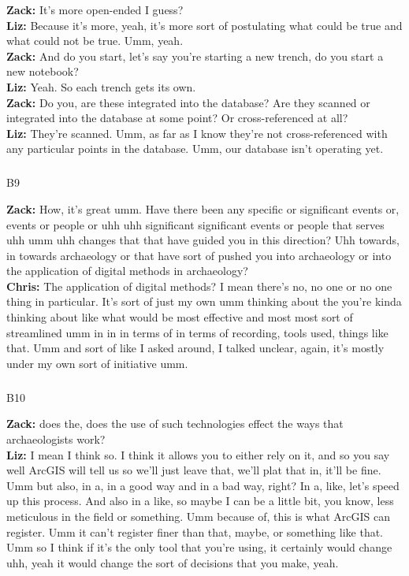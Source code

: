 \documentclass[
]{article}
\makeatletter
\let\oldsubparagraph\subparagraph
\renewcommand{\subparagraph}{
    \@ifstar
      \xxxSubParagraphStar
      \xxxSubParagraphNoStar
  }
\newcommand{\xxxSubParagraphStar}[1]{\oldsubparagraph*{#1}\mbox{}}
\newcommand{\xxxSubParagraphNoStar}[1]{\oldsubparagraph{#1}\mbox{}}
\makeatother
\begin{document}
\textbf{Zack:} It's more open-ended I guess?\\
\textbf{Liz:} Because it's more, yeah, it's more sort of postulating
what could be true and what could not be true. Umm, yeah.\\
\textbf{Zack:} And do you start, let's say you're starting a new trench,
do you start a new notebook?\\
\textbf{Liz:} Yeah. So each trench gets its own.\\
\textbf{Zack:} Do you, are these integrated into the database? Are they
scanned or integrated into the database at some point? Or
cross-referenced at all?\\
\textbf{Liz:} They're scanned. Umm, as far as I know they're not
cross-referenced with any particular points in the database. Umm, our
database isn't operating yet.

\subparagraph{B9}\label{sec-B9}

\textbf{Zack:} How, it's great umm. Have there been any specific or
significant events or, events or people or uhh uhh significant
significant events or people that serves uhh umm uhh changes that that
have guided you in this direction? Uhh towards, in towards archaeology
or that have sort of pushed you into archaeology or into the application
of digital methods in archaeology?\\
\textbf{Chris:} The application of digital methods? I mean there's no,
no one or no one thing in particular. It's sort of just my own umm
thinking about the you're kinda thinking about like what would be most
effective and most most sort of streamlined umm in in in terms of in
terms of recording, tools used, things like that. Umm and sort of like I
asked around, I talked unclear, again, it's mostly under my own sort of
initiative umm.

\subparagraph{B10}\label{sec-B10}

\textbf{Zack:} does the, does the use of such technologies effect the
ways that archaeologists work?\\
\textbf{Liz:} I mean I think so. I think it allows you to either rely on
it, and so you say well ArcGIS will tell us so we'll just leave that,
we'll plat that in, it'll be fine. Umm but also, in a, in a good way and
in a bad way, right? In a, like, let's speed up this process. And also
in a like, so maybe I can be a little bit, you know, less meticulous in
the field or something. Umm because of, this is what ArcGIS can
register. Umm it can't register finer than that, maybe, or something
like that. Umm so I think if it's the only tool that you're using, it
certainly would change uhh, yeah it would change the sort of decisions
that you make, yeah.
\end{document}
